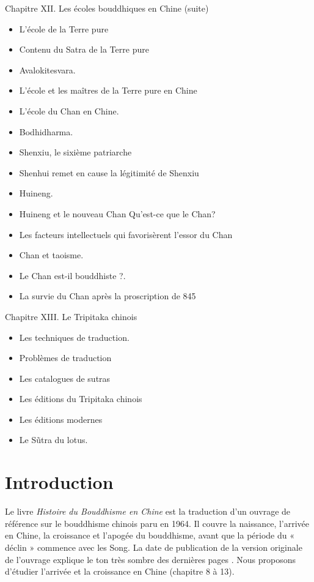 Chapitre XII. Les écoles bouddhiques en Chine (suite)

    \begin{itemize}
        \item L'école de la Terre pure
        \item Contenu du Satra de la Terre pure
        \item Avalokitesvara.
        \item L'école et les maîtres de la Terre pure en Chine
        \item L'école du Chan en Chine.
        \item Bodhidharma.
        \item Shenxiu, le sixième patriarche
        \item Shenhui remet en cause la légitimité de Shenxiu
        \item Huineng.
        \item Huineng et le nouveau Chan Qu'est-ce que le Chan?
        \item Les facteurs intellectuels qui favorisèrent l'essor du Chan
        \item Chan et taoisme.
        \item Le Chan est-il bouddhiste ?.
        \item La survie du Chan après la proscription de 845
    \end{itemize}

Chapitre XIII. Le Tripitaka chinois

    \begin{itemize}
        \item Les techniques de traduction.
        \item Problèmes de traduction
        \item Les catalogues de sutras
        \item Les éditions du Tripitaka chinois
        \item Les éditions modernes
        \item Le Sũtra du lotus.
    \end{itemize}



\section{Introduction}

Le livre \textit{Histoire du Bouddhisme en Chine} \cite{chen_histoire_2015} est la traduction d’un ouvrage de référence sur le bouddhisme chinois paru en 1964. Il couvre  la naissance, l’arrivée en Chine, la croissance et l’apogée du bouddhisme, avant que la période du « déclin » commence avec les Song. 
La date de publication de la version originale de l’ouvrage explique le ton très sombre des dernières pages \cite{vermander_kenneth_2016}.
Nous proposons d'étudier l'arrivée et la croissance en Chine (chapitre 8 à 13).






